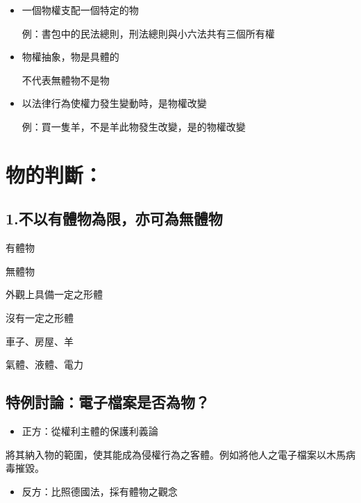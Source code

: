 \documentclass[
]{book}
\providecommand{\tightlist}{%
  \setlength{\itemsep}{0pt}\setlength{\parskip}{0pt}}
\begin{document}
\begin{itemize}
\item
  一個物權支配一個特定的物

  例：書包中的民法總則，刑法總則與小六法共有三個所有權
\item
  物權抽象，物是具體的

  不代表無體物不是物
\item
  以法律行為使權力發生變動時，是物權改變

  例：買一隻羊，不是羊此物發生改變，是的物權改變
\end{itemize}

\pagebreak

\hypertarget{ux7269ux7684ux5224ux65b7}{%
\section{物的判斷：}\label{ux7269ux7684ux5224ux65b7}}

\hypertarget{ux4e0dux4ee5ux6709ux9ad4ux7269ux70baux9650ux4ea6ux53efux70baux7121ux9ad4ux7269}{%
\subsection{1.不以有體物為限，亦可為無體物}\label{ux4e0dux4ee5ux6709ux9ad4ux7269ux70baux9650ux4ea6ux53efux70baux7121ux9ad4ux7269}}

有體物

無體物

外觀上具備一定之形體

沒有一定之形體

車子、房屋、羊

氣體、液體、電力

\hypertarget{ux7279ux4f8bux8a0eux8ad6ux96fbux5b50ux6a94ux6848ux662fux5426ux70baux7269}{%
\subsection{特例討論：電子檔案是否為物？}\label{ux7279ux4f8bux8a0eux8ad6ux96fbux5b50ux6a94ux6848ux662fux5426ux70baux7269}}

\begin{itemize}
\tightlist
\item
  正方：從權利主體的保護利義論
\end{itemize}

將其納入物的範圍，使其能成為侵權行為之客體。例如將他人之電子檔案以木馬病毒摧毀。

\begin{itemize}
\tightlist
\item
  反方：比照德國法，採有體物之觀念
\end{itemize}
\end{document}
